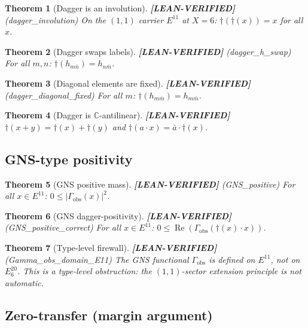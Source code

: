 \documentclass[11pt]{article}
\newtheorem{theorem}{Theorem}[section]
\theoremstyle{remark}
\newcommand{\LEANVERIFIED}{\textbf{\color{green!60!black}[LEAN-VERIFIED]}}
\begin{document}
\begin{theorem}[Dagger is an involution] \LEANVERIFIED{} \textnormal{(dagger\_involution)}
On the $(1,1)$ carrier $E^{11}$ at $X=6$: $\dagger(\dagger(x)) = x$ for all $x$.
\end{theorem}

\begin{theorem}[Dagger swaps labels] \LEANVERIFIED{} \textnormal{(dagger\_h\_swap)}
For all $m, n$: $\dagger(h_{m\bar{n}}) = h_{n\bar{m}}$.
\end{theorem}

\begin{theorem}[Diagonal elements are fixed] \LEANVERIFIED{} \textnormal{(dagger\_diagonal\_fixed)}
For all $m$: $\dagger(h_{m\bar{m}}) = h_{m\bar{m}}$.
\end{theorem}

\begin{theorem}[Dagger is $\mathbb{C}$-antilinear] \LEANVERIFIED{}
$\dagger(x + y) = \dagger(x) + \dagger(y)$ and $\dagger(a \cdot x) = \bar{a} \cdot \dagger(x)$.
\end{theorem}

\subsection{GNS-type positivity}

\begin{theorem}[GNS positive mass] \LEANVERIFIED{} \textnormal{(GNS\_positive)}
For all $x \in E^{11}$: $0 \leq |\Gamma_{\mathrm{obs}}(x)|^2$.
\end{theorem}

\begin{theorem}[GNS dagger-positivity] \LEANVERIFIED{} \textnormal{(GNS\_positive\_correct)}
For all $x \in E^{11}$: $0 \leq \operatorname{Re}(\Gamma_{\mathrm{obs}}(\dagger(x) \cdot x))$.
\end{theorem}

\begin{theorem}[Type-level firewall] \LEANVERIFIED{} \textnormal{(Gamma\_obs\_domain\_E11)}
The GNS functional $\Gamma_{\mathrm{obs}}$ is defined on $E^{11}$, not on $E^{20}_6$.
This is a type-level obstruction: the $(1,1)$-sector extension principle is not automatic.
\end{theorem}

\subsection{Zero-transfer (margin argument)}
\end{document}
